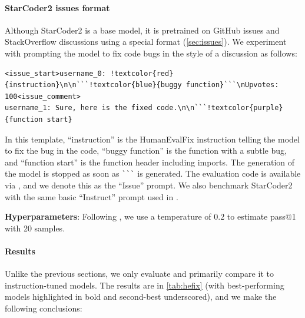 \documentclass[10pt]{article} %
\begin{document}
\paragraph{StarCoder2 issues format} Although StarCoder2 is a base model, it is pretrained on GitHub issues and StackOverflow discussions using a special format (\cref{sec:issues}). We experiment with prompting the model to fix code bugs in the style of a discussion as follows:
\begin{Verbatim}[commandchars=!\{\}]
<issue_start>username_0: !textcolor{red}{instruction}\n\n```!textcolor{blue}{buggy function}```\nUpvotes: 100<issue_comment>
username_1: Sure, here is the fixed code.\n\n```!textcolor{purple}{function start}
\end{Verbatim}
In this template, ``instruction'' is the HumanEvalFix instruction telling the model to fix the bug in the code, ``buggy function'' is the function with a subtle bug, and ``function start'' is the function header including imports. The generation of the model is stopped as soon as \verb|```| is generated. The evaluation code is available via \citet{bigcode-evaluation-harness}, and we denote this as the ``Issue'' prompt. We also benchmark StarCoder2 with the same basic ``Instruct'' prompt used in \citet{muennighoff2023octopack}.

\textbf{Hyperparameters}: Following \citep{muennighoff2023octopack}, we use a temperature of 0.2 to estimate pass@1 with 20 samples.

\paragraph{Results} Unlike the previous sections, we only evaluate  and primarily compare it to instruction-tuned models. The results are in \cref{tab:hefix} (with best-performing models highlighted in bold and second-best underscored), and we make the following conclusions:
\end{document}
